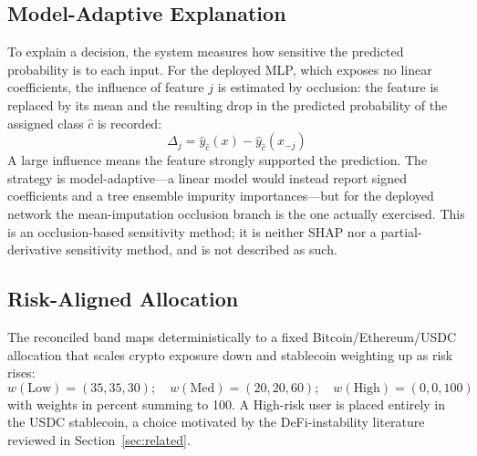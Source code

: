 \subsection{Model-Adaptive Explanation}\label{subsec:explanation}
To explain a decision, the system measures how sensitive the predicted probability is to
each input. For the deployed MLP, which exposes no linear coefficients, the influence of
feature $j$ is estimated by occlusion: the feature is replaced by its mean and the
resulting drop in the predicted probability of the assigned class $\hat{c}$ is recorded:
\begin{equation}\label{eq:occlusion}
\Delta_j = \hat{y}_{\hat{c}}(x) - \hat{y}_{\hat{c}}(x_{-j})
\end{equation}
A large influence means the feature strongly supported the prediction. The strategy is
model-adaptive---a linear model would instead report signed coefficients and a tree
ensemble impurity importances---but for the deployed network the mean-imputation
occlusion branch is the one actually exercised. This is an occlusion-based sensitivity
method; it is neither SHAP nor a partial-derivative sensitivity method, and is not
described as such.

\subsection{Risk-Aligned Allocation}\label{subsec:allocation}
The reconciled band maps deterministically to a fixed Bitcoin/Ethereum/USDC allocation
that scales crypto exposure down and stablecoin weighting up as risk rises:
\begin{equation}\label{eq:alloc}
w(\text{Low}) = (35, 35, 30);\quad w(\text{Med}) = (20, 20, 60);\quad w(\text{High}) =
(0, 0, 100)
\end{equation}
with weights in percent summing to 100. A High-risk user is placed entirely in the USDC
stablecoin, a choice motivated by the DeFi-instability literature reviewed in
Section~\ref{sec:related}.

